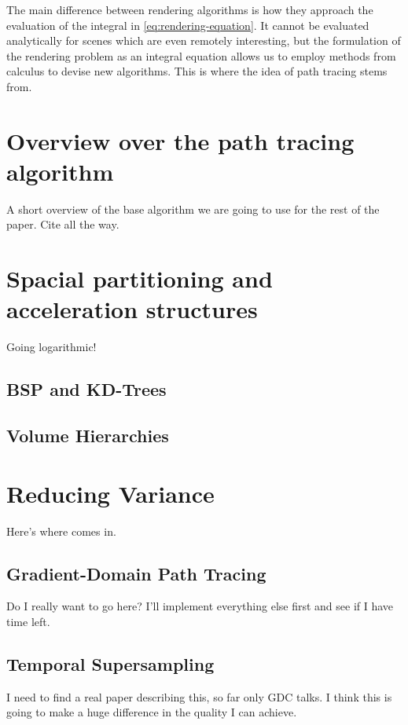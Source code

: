 \documentclass{ACGSeminar}
\begin{document}
The main difference between rendering algorithms is how they approach the evaluation of the integral in \eqref{eq:rendering-equation}. It cannot be evaluated analytically for scenes which are even remotely interesting, but the formulation of the rendering problem as an integral equation allows us to employ methods from calculus to devise new algorithms. This is where the idea of path tracing stems from.


\section{Overview over the path tracing algorithm}
A short overview of the base algorithm we are going to use for the rest of the paper. Cite \cite{veach1997robust} all the way.


\section{Spacial partitioning and acceleration structures}
Going logarithmic!
\subsection{BSP and KD-Trees}
\subsection{Volume Hierarchies}

\section{Reducing Variance}
Here's where \cite{Pharr:2010:PBR:1854996} comes in.
\subsection{Gradient-Domain Path Tracing}
Do I really want to go here? \cite{Kettunen2015sg} I'll implement everything else first and see if I have time left.
\subsection{Temporal Supersampling}
I need to find a real paper describing this, so far only GDC talks. I think this is going to make a huge difference in the quality I can achieve.
\end{document}
